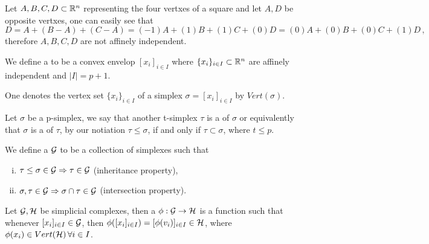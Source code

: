 \documentclass[../1.tex]{subfiles}
\begin{document}
    \begin{exa}
        Let ${A,B,C,D} \subset \mathbb{R}^n$ representing the four vertxes of a square and let $A,D$ be opposite vertxes, one can easily see that 
        \[ D = A + (B-A) + (C-A) = (-1)A + (1)B + (1)C + (0)D = (0)A + (0)B + (0)C + (1)D \, ,\]
        therefore $A,B,C,D$ are not affinely independent.
    \end{exa}

    \begin{defn}
        We define a  to be a convex envelop $[ x_i ]_{i \in I}$
        where $\{x_i\}_{i \in I} \subset \mathbb{R}^n$ are affinely independent and $|I| = p + 1$.
    \end{defn}
    
    One denotes the vertex set $\{ x_i \}_{i \in I}$ of a simplex $\sigma = [ x_i ]_{i \in I}$ by $Vert(\sigma)$.
    
    \begin{defn}
        Let $\sigma$ be a p-simplex, we say that another t-simplex $\tau$ is a  of $\sigma$ or equivalently 
        that $\sigma$ is a  of $\tau$, by our notiation $\tau \leq \sigma$, if and only if $\tau \subset \sigma$, where $t \leq p$.
    \end{defn}

    \begin{defn}
        We define a  $\mathcal{G}$ to be a collection of simplexes such that
        \begin{enumerate}[(i)]
            \item $ \tau \leq \sigma \in \mathcal{G} \Rightarrow \tau \in \mathcal{G}$ (inheritance property),
            \item $ \sigma, \tau \in \mathcal{G} \Rightarrow \sigma \cap \tau \in \mathcal{G}$ (intersection property).
        \end{enumerate}
    \end{defn}

    \begin{defn}
        Let $\mathcal{G},\mathcal{H}$ be simplicial complexes, then a  $\phi : \mathcal{G} \to \mathcal{H}$ is a function 
        such that whenever $[ x_i ]_{i \in I} \in \mathcal{G}$, then $\phi([ x_i ]_{i \in I}) = [ \phi(v_i) ]_{i \in I} \in \mathcal{H}$,
        where $\phi(x_i) \in Vert(\mathcal{H}) \, \forall i \in I$.
    \end{defn}

    \begin{thm}[ $\bb{G}$ is a category]
    \end{thm}
\end{document}
